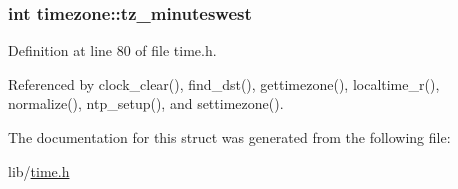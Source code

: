 \subsubsection[{\texorpdfstring{tz\+\_\+minuteswest}{tz_minuteswest}}]{\setlength{\rightskip}{0pt plus 5cm}int timezone\+::tz\+\_\+minuteswest}\hypertarget{structtimezone_a3042f7eff6e1b980728def76b1fa0eb7}{}\label{structtimezone_a3042f7eff6e1b980728def76b1fa0eb7}


Definition at line 80 of file time.\+h.



Referenced by clock\+\_\+clear(), find\+\_\+dst(), gettimezone(), localtime\+\_\+r(), normalize(), ntp\+\_\+setup(), and settimezone().



The documentation for this struct was generated from the following file\+:\begin{DoxyCompactItemize}
\item 
lib/\hyperlink{time_8h}{time.\+h}\end{DoxyCompactItemize}
